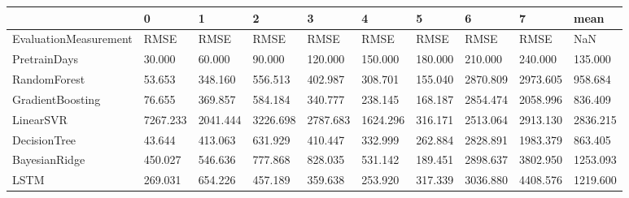 \begin{tabular}{llllllllll}
\toprule
{} &        0 &        1 &        2 &        3 &        4 &       5 &        6 &        7 &     mean \\
\midrule
EvaluationMeasurement &     RMSE &     RMSE &     RMSE &     RMSE &     RMSE &    RMSE &     RMSE &     RMSE &      NaN \\
PretrainDays          &   30.000 &   60.000 &   90.000 &  120.000 &  150.000 & 180.000 &  210.000 &  240.000 &  135.000 \\
RandomForest          &   53.653 &  348.160 &  556.513 &  402.987 &  308.701 & 155.040 & 2870.809 & 2973.605 &  958.684 \\
GradientBoosting      &   76.655 &  369.857 &  584.184 &  340.777 &  238.145 & 168.187 & 2854.474 & 2058.996 &  836.409 \\
LinearSVR             & 7267.233 & 2041.444 & 3226.698 & 2787.683 & 1624.296 & 316.171 & 2513.064 & 2913.130 & 2836.215 \\
DecisionTree          &   43.644 &  413.063 &  631.929 &  410.447 &  332.999 & 262.884 & 2828.891 & 1983.379 &  863.405 \\
BayesianRidge         &  450.027 &  546.636 &  777.868 &  828.035 &  531.142 & 189.451 & 2898.637 & 3802.950 & 1253.093 \\
LSTM                  &  269.031 &  654.226 &  457.189 &  359.638 &  253.920 & 317.339 & 3036.880 & 4408.576 & 1219.600 \\
\bottomrule
\end{tabular}
